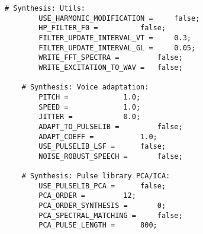 \begin{lstlisting}[caption = Configuration file]
	# Synthesis: Utils:
		USE_HARMONIC_MODIFICATION = 	false;
		HP_FILTER_F0 = 			false;
		FILTER_UPDATE_INTERVAL_VT = 	0.3;
		FILTER_UPDATE_INTERVAL_GL = 	0.05;
		WRITE_FFT_SPECTRA = 		false;
		WRITE_EXCITATION_TO_WAV = 	false;

	# Synthesis: Voice adaptation:
		PITCH = 			1.0;
		SPEED = 			1.0;
		JITTER = 			0.0;
		ADAPT_TO_PULSELIB = 		false;
		ADAPT_COEFF = 			1.0;
		USE_PULSELIB_LSF = 		false;
		NOISE_ROBUST_SPEECH = 		false;

	# Synthesis: Pulse library PCA/ICA:
		USE_PULSELIB_PCA =		false;
		PCA_ORDER =			12;
		PCA_ORDER_SYNTHESIS =		0;
		PCA_SPECTRAL_MATCHING = 	false;
		PCA_PULSE_LENGTH = 		800;
\end{lstlisting}